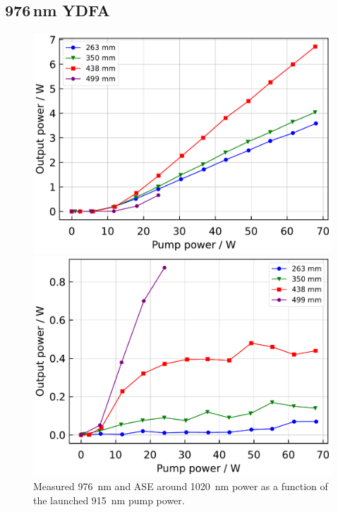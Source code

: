 \documentclass{osa-article}
\begin{document}
\subsection{976\,nm YDFA}

\begin{figure}[h!]
  \begin{minipage}[b]{0.5\linewidth}
    \centering
    \includegraphics[keepaspectratio, width=0.9\linewidth]{./Figure/Yb1200-20-125DC-PM_SignalComparisonByLength_915Pump976Seed_Exp}
    \subcaption{}
  \end{minipage}
  \begin{minipage}[b]{0.5\linewidth}
    \centering
    \includegraphics[keepaspectratio, width=0.9\linewidth]{./Figure/Yb1200-20-125DC-PM_ASEComparisonByLength_915Pump976Seed_Exp}
    \subcaption{}
  \end{minipage}
  \caption{Measured \SI{976}{\nm} and ASE around \SI{1020}{\nm} power as a function of the launched \SI{915}{\nm} pump power.}
  \label{fig:OutputComparisonOfNLIGHT976YDFA}
\end{figure}
\end{document}
